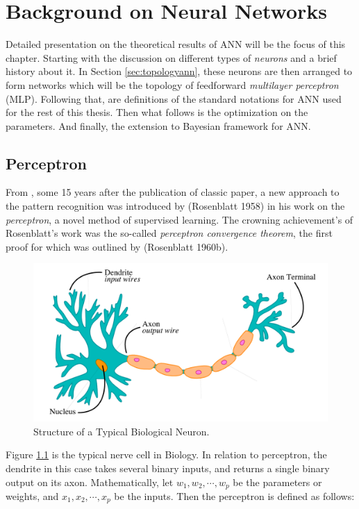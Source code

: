 \chapter{Background on Neural Networks}
Detailed presentation on the theoretical results of ANN will be the focus of this chapter. Starting with the discussion on different types of \textit{neurons} and a brief history about it. In Section \ref{sec:topologyann}, these neurons are then arranged to form networks which will be the topology of feedforward \textit{multilayer perceptron} (MLP). Following that, are definitions of the standard notations for ANN used for the rest of this thesis. Then what follows is the optimization on the parameters. And finally, the extension to Bayesian framework for ANN.
\section{Perceptron}
From , some 15 years after the publication of  classic paper, a new approach to the pattern recognition was introduced by (Rosenblatt 1958) in his work on the \textit{perceptron}, a novel method of supervised learning. The crowning achievement's of Rosenblatt's work was the so-called \textit{perceptron convergence theorem}, the first proof for which was outlined by (Rosenblatt 1960b).

\begin{figure}[!h]
\centering\includegraphics[scale = .4]{img/Neuron.pdf}
\caption[Structure of a Typical Biological Neuron]{Structure of a Typical Biological Neuron.\protect\footnotemark}
\label{fig:neuron}
\end{figure}


Figure \ref{fig:neuron} is the typical nerve cell in Biology. In relation to perceptron, the dendrite in this case takes several binary inputs, and returns a single binary output on its axon. Mathematically, let $w_1,w_2,\cdots,w_p$ be the parameters or weights, and $x_1,x_2,\cdots, x_p$ be the inputs. Then the perceptron is defined as follows:

